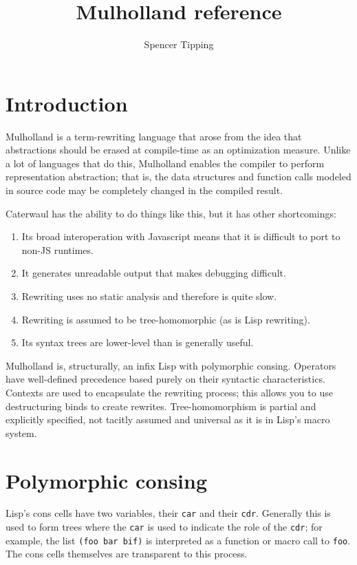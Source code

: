 \documentclass{report}
\title{Mulholland reference}
\author{Spencer Tipping}
\begin{document}
\maketitle{}
\tableofcontents{}

\chapter*{Introduction}
  Mulholland is a term-rewriting language that arose from the idea that abstractions should be erased at compile-time as an optimization measure. Unlike a lot of languages that do this,
  Mulholland enables the compiler to perform representation abstraction; that is, the data structures and function calls modeled in source code may be completely changed in the compiled
  result.

  Caterwaul has the ability to do things like this, but it has other shortcomings:

\begin{enumerate}
\item{Its broad interoperation with Javascript means that it is difficult to port to non-JS runtimes.}
\item{It generates unreadable output that makes debugging difficult.}
\item{Rewriting uses no static analysis and therefore is quite slow.}
\item{Rewriting is assumed to be tree-homomorphic (as is Lisp rewriting).}
\item{Its syntax trees are lower-level than is generally useful.}
\end{enumerate}

  Mulholland is, structurally, an infix Lisp with polymorphic consing. Operators have well-defined precedence based purely on their syntactic characteristics. Contexts are used to encapsulate
  the rewriting process; this allows you to use destructuring binds to create rewrites. Tree-homomorphism is partial and explicitly specified, not tacitly assumed and universal as it is in
  Lisp's macro system.

\chapter{Polymorphic consing}
  Lisp's cons cells have two variables, their {\tt car} and their {\tt cdr}. Generally this is used to form trees where the {\tt car} is used to indicate the role of the {\tt cdr}; for
  example, the list {\tt (foo bar bif)} is interpreted as a function or macro call to {\tt foo}. The cons cells themselves are transparent to this process.
\end{document}
